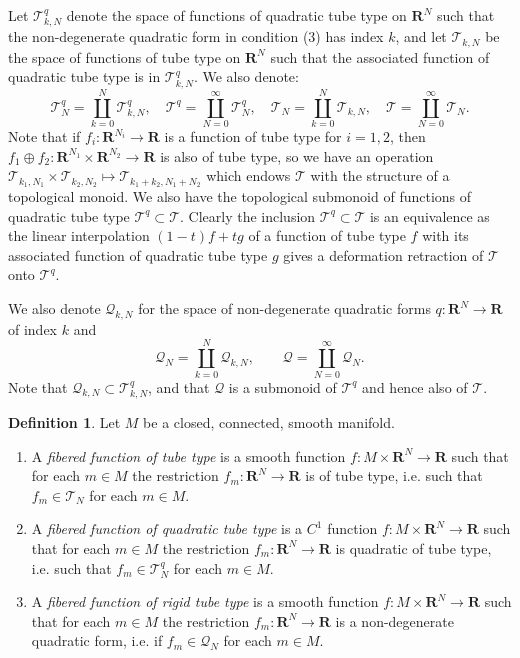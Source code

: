 \documentclass{amsart}
\newcommand\cQ{\mathcal{Q}}
\newcommand\cT{\mathcal{T}}
\def\bR{\mathbf{R}}
\theoremstyle{definition}
\newtheorem{definition}[theorem]{Definition}
\theoremstyle{remark}
\newtheorem{inductive lemma}[theorem]{Inductive Lemma}
\begin{document}
Let $\cT_{k,N}^q$ denote the space of functions of quadratic tube type on $\bR^N$ such that the non-degenerate quadratic form in condition (3) has index $k$, and let $\cT_{k,N}$ be the space of functions of tube type on $\bR^N$ such that the associated function of quadratic tube type is in $\cT_{k,N}^q$. We also denote:
$$ \cT^q_N = \coprod_{k=0}^N \cT^q_{k,N}, \quad \cT^q = \coprod_{N=0}^\infty \cT^q_N , \quad \cT_N = \coprod_{k=0}^N \cT_{k,N}, \quad \cT = \coprod_{N=0}^\infty \cT_N. $$
Note that if $f_i:\bR^{N_i} \to \bR$ is a function of tube type for $i=1,2$, then $f_1 \oplus f_2 : \bR^{N_1} \times \bR^{N_2} \to \bR$ is also of tube type, so we have an operation $\cT_{k_1,N_1} \times \cT_{k_2,N_2} \mapsto \cT_{k_1+k_2,N_1+N_2}$ which endows $\cT$ with the structure of a topological monoid. We also have the topological submonoid of functions of quadratic tube type $\cT^q \subset \cT$.  Clearly the inclusion $\cT^q \subset \cT$ is an equivalence as the linear interpolation $(1-t)f+tg$ of a function of tube type $f$ with its associated function of quadratic tube type $g$ gives a deformation retraction of $\cT$ onto $\cT^q$.

We also denote $\cQ_{k,N}$ for the space of non-degenerate quadratic forms $q:\bR^N \to \bR$ of index $k$ and
$$ \cQ_N = \coprod_{k=0}^N \cQ_{k,N} , \qquad \cQ= \coprod_{N=0}^\infty \cQ_N. $$
Note that $\cQ_{k,N} \subset \cT_{k,N}^q$, and that $\cQ$ is a submonoid of $\cT^q$ and hence also of $\cT$.   %

\begin{definition}
Let $M$ be a closed, connected, smooth manifold.
\begin{enumerate}
\item A {\em{fibered function of tube type}}  is a smooth function $f:M \times \bR^N \to \bR$ such that for each $m \in M$ the restriction $f_m : \bR^N \to \bR$ is of tube type, i.e. such that $f_m \in \cT_N$ for each $m \in M$. 
\item A {\em{fibered function of quadratic tube type}}  is a $C^1$ function $f:M \times \bR^N \to \bR$ such that for each $m \in M$ the restriction $f_m : \bR^N \to \bR$ is quadratic of tube type, i.e. such that $f_m \in \cT_N^q$ for each $m \in M$. 
\item A {\em{fibered function of rigid tube type}}  is a smooth function $f:M \times \bR^N \to \bR$ such that for each $m \in M$ the restriction $f_m : \bR^N \to \bR$ is a non-degenerate quadratic form, i.e. if $f_m \in \cQ_N$ for each $m \in M$. 
\end{enumerate}
\end{definition}
\end{document}
